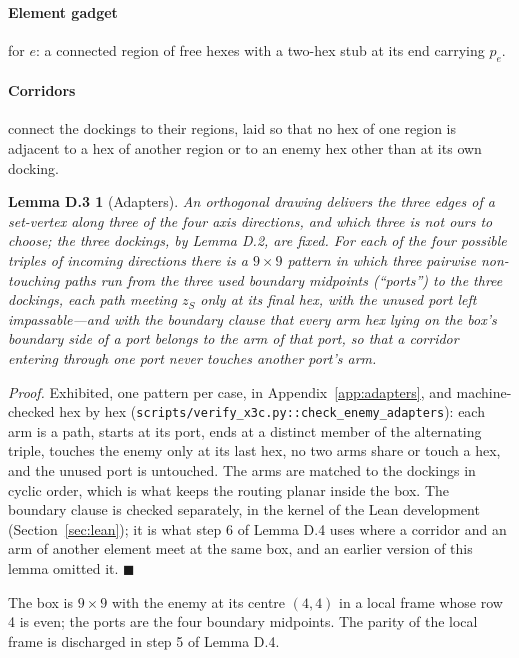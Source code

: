 \documentclass[11pt,a4paper]{article}
\theoremstyle{plain}
\newtheorem*{lemadapt}{Lemma D.3}
\theoremstyle{definition}
\theoremstyle{plain}
\theoremstyle{definition}
\theoremstyle{remark}
\newcommand{\src}[1]{\texttt{#1}}
\newcommand{\qedbox}{\hfill$\blacksquare$}
\begin{document}
\paragraph{Element gadget} for $e$: a connected region of free hexes with a two-hex stub at its
end carrying $p_e$.

\paragraph{Corridors} connect the dockings to their regions, laid so that no hex of one region is
adjacent to a hex of another region or to an enemy hex other than at its own docking.

\begin{lemadapt}[Adapters]
An orthogonal drawing delivers the three edges of a set-vertex along three of the four axis
directions, and which three is not ours to choose; the three dockings, by Lemma D.2, are fixed.
For each of the four possible triples of incoming directions there is a $9\times 9$ pattern in
which three pairwise non-touching paths run from the three used boundary midpoints (``ports'') to
the three dockings, each path meeting $z_S$ only at its final hex, with the unused port left
impassable---and with the boundary clause that every arm hex lying on the box's boundary side
of a port belongs to the arm of that port, so that a corridor entering through one port never
touches another port's arm.
\end{lemadapt}

\noindent\emph{Proof.} Exhibited, one pattern per case, in Appendix~\ref{app:adapters}, and
machine-checked hex by hex (\src{scripts/verify\_x3c.py::check\_enemy\_adapters}): each arm is a
path, starts at its port, ends at a distinct member of the alternating triple, touches the enemy
only at its last hex, no two arms share or touch a hex, and the unused port is untouched. The
arms are matched to the dockings in cyclic order, which is what keeps the routing planar inside
the box. The boundary clause is checked separately, in the kernel of the Lean development
(Section~\ref{sec:lean}); it is what step 6 of Lemma D.4 uses where a corridor and an arm of
another element meet at the same box, and an earlier version of this lemma omitted it. \qedbox

\smallskip
The box is $9\times 9$ with the enemy at its centre $(4,4)$ in a local frame whose row 4 is even;
the ports are the four boundary midpoints. The parity of the local frame is discharged in step 5
of Lemma D.4.
\end{document}
